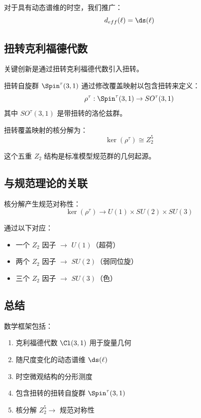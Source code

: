 对于具有动态谱维的时空，我们推广：
\begin{equation}
    d_{eff}(\ell) = \ds(\ell)
\end{equation}

\subsection{扭转克利福德代数}

关键创新是通过扭转克利福德代数引入扭转。

\begin{definition}[扭转自旋群]
扭转自旋群 $\Spin^\tau(3,1)$ 通过修改覆盖映射以包含扭转来定义：
\begin{equation}
    \rho^\tau: \Spin^\tau(3,1) \to SO^\tau(3,1)
\end{equation}
其中 $SO^\tau(3,1)$ 是带扭转的洛伦兹群。
\end{definition}

\begin{theorem}[核分解]
扭转覆盖映射的核分解为：
\begin{equation}
    \ker(\rho^\tau) \cong Z_2^5
\end{equation}
\end{theorem}

这个五重 $Z_2$ 结构是标准模型规范群的几何起源。

\subsection{与规范理论的关联}

核分解产生规范对称性：
\begin{equation}
    \ker(\rho^\tau) \to U(1) \times SU(2) \times SU(3)
\end{equation}

通过以下对应：
\begin{itemize}
    \item 一个 $Z_2$ 因子 $\to$ $U(1)$（超荷）
    \item 两个 $Z_2$ 因子 $\to$ $SU(2)$（弱同位旋）
    \item 三个 $Z_2$ 因子 $\to$ $SU(3)$（色）
\end{itemize}

\subsection{总结}

数学框架包括：
\begin{enumerate}
    \item 克利福德代数 $\Cl(3,1)$ 用于旋量几何
    \item 随尺度变化的动态谱维 $\ds(\ell)$
    \item 时空微观结构的分形测度
    \item 包含扭转的扭转自旋群 $\Spin^\tau(3,1)$
    \item 核分解 $Z_2^5 \to$ 规范对称性
\end{enumerate}

